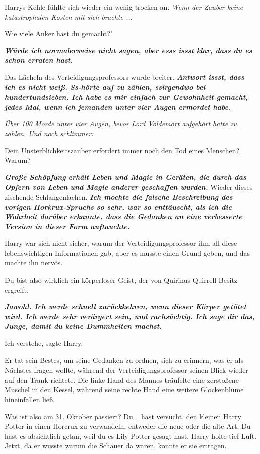 Harrys Kehle fühlte sich wieder ein wenig trocken an.
\emph{Wenn der Zauber keine katastrophalen Kosten mit sich brachte ...}

\glqq Wie viele Anker hast du gemacht?"

\glqq \textbf{\emph{Würde ich normalerweise nicht sagen, aber esss issst klar,
dass du es schon erraten hast.}}\grqq{}

Das Lächeln des Verteidigungsprofessors wurde breiter. \glqq
\textbf{\emph{Antwort issst, dass ich es nicht weiß. Ss-hörte auf zu zählen,
ssirgendwo bei hundertundsieben. Ich habe es mir einfach zur Gewohnheit gemacht,
jedes Mal, wenn ich jemanden unter vier Augen ermordet habe.}}\grqq{}

\emph{Über 100 Morde unter vier Augen, bevor Lord Voldemort aufgehört hatte zu zählen. Und noch schlimmer: }

\glqq Dein Unsterblichkeitszauber erfordert immer noch den Tod eines Menschen?
Warum?\grqq{}

\glqq \textbf{\emph{Große Schöpfung erhält Leben und Magie in Geräten, die durch
das Opfern von Leben und Magie anderer geschaffen wurden.}}\grqq{} Wieder dieses
zischende Schlangenlachen. \glqq \textbf{\emph{Ich mochte die falsche
Beschreibung des vorigen Horkrux-Spruchs so sehr, war so enttäuscht, als ich die
Wahrheit darüber erkannte, dass die Gedanken an eine verbesserte Version in
dieser Form auftauchte.}}\grqq{}

Harry war sich nicht sicher, warum der Verteidigungsprofessor ihm all diese
lebenswichtigen Informationen gab, aber es musste einen Grund geben, und das
machte ihn nervös.

\glqq Du bist also wirklich ein körperloser Geist, der von Quirinus Quirrell
Besitz ergreift.\grqq{}

\glqq \textbf{\emph{Jawohl. Ich werde schnell zurückkehren, wenn dieser Körper
getötet wird. Ich werde sehr verärgert sein, und rachsüchtig. Ich sage dir das,
Junge, damit du keine Dummheiten machst.}}\grqq{}

\glqq Ich verstehe\grqq{}, sagte Harry.

Er tat sein Bestes, um seine Gedanken zu ordnen, sich zu erinnern, was er als
Nächstes fragen wollte, während der Verteidigungsprofessor seinen Blick wieder
auf den Trank richtete. Die linke Hand des Mannes träufelte eine zerstoßene
Muschel in den Kessel, während seine rechte Hand eine weitere Glockenblume
hineinfallen ließ.

\glqq Was ist also am 31. Oktober passiert? Du... hast versucht, den kleinen
Harry Potter in einen Horcrux zu verwandeln, entweder die neue oder die alte
Art. Du hast es absichtlich getan, weil du es Lily Potter gesagt hast.\grqq{}
Harry holte tief Luft. Jetzt, da er wusste warum die Schauer da waren, konnte er
sie ertragen.


